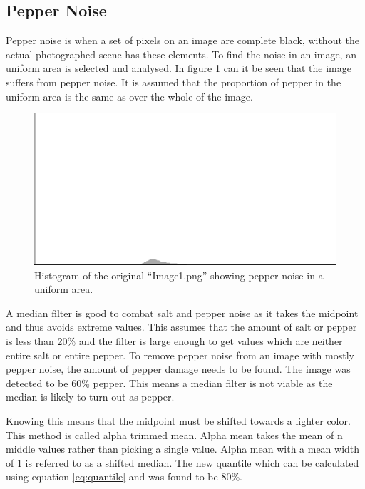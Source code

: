 \subsection{Pepper Noise}\label{image_1}
Pepper noise is when a set of pixels on an image are complete black, without the actual photographed scene has these elements.
To find the noise in an image, an uniform area is selected and analysed.
In figure \ref{fig:hist_pepper_im01} can it be seen that the image suffers from pepper noise.
It is assumed that the proportion of pepper in the uniform area is the same as over the whole of the image.

\begin{figure}[H]
\centering
\includegraphics[width = \histogramWidth]{graphics/hist1_uniform.png}
\caption{Histogram of the original ``Image1.png'' showing pepper noise in a uniform area.}
\label{fig:hist_pepper_im01}
\end{figure}

A median filter is good to combat salt and pepper noise as it takes the midpoint and thus avoids extreme values.
This assumes that the amount of salt or pepper is less than 20\% and the filter is large enough to get values which are neither entire salt or entire pepper.
To remove pepper noise from an image with mostly pepper noise, the amount of pepper damage needs to be found.
The image was detected to be 60\% pepper.
This means a median filter is not viable as the median is likely to turn out as pepper.

Knowing this means that the midpoint must be shifted towards a lighter color.
This method is called alpha trimmed mean.
Alpha mean takes the mean of n middle values rather than picking a single value.
Alpha mean with a mean width of 1 is referred to as a shifted median.
The new quantile which can be calculated using equation \ref{eq:quantile} and was found to be 80\%. 

